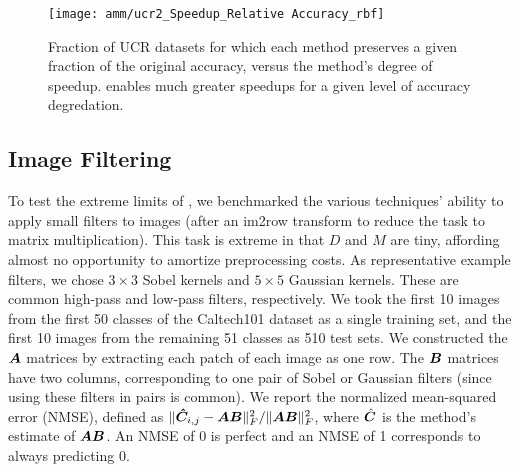 
\begin{figure}[h]
\begin{center}
\texttt{[image: amm/ucr2\_Speedup\_Relative Accuracy\_rbf]}
\caption{Fraction of UCR datasets for which each method preserves a given fraction of the original accuracy, versus the method's degree of speedup. \oursp enables much greater speedups for a given level of accuracy degredation.}
\label{fig:ucr}
\end{center}
\end{figure}

\vspace{-1mm}
\subsection{Image Filtering}
\vspace{-.5mm}

To test the extreme limits of \ours, we benchmarked the various techniques' ability to apply small filters to images (after an im2row transform to reduce the task to matrix multiplication). This task is extreme in that $D$ and $M$ are tiny, affording almost no opportunity to amortize preprocessing costs. As representative example filters, we chose $3 \times 3$ Sobel kernels and $5 \times 5$ Gaussian kernels. These are common high-pass and low-pass filters, respectively. We took the first 10 images from the first 50 classes of the Caltech101 dataset \cite{caltech} as a single training set, and the first 10 images from the remaining 51 classes as 510 test sets. We constructed the $\bm{A}$ matrices by extracting each patch of each image as one row. The $\bm{B}$ matrices have two columns, corresponding to one pair of Sobel or Gaussian filters (since using these filters in pairs is common). %
We report the normalized mean-squared error (NMSE), defined as $\lVert\bm{\hat{C}}_{i,j} - \bm{A}\bm{B}\rVert^2_F / \lVert\bm{A}\bm{B}\rVert^2_F$, where $\hat{\bm{C}}$ is the method's estimate of $\bm{A}\bm{B}$. An NMSE of 0 is perfect and an NMSE of 1 corresponds to always predicting 0.

